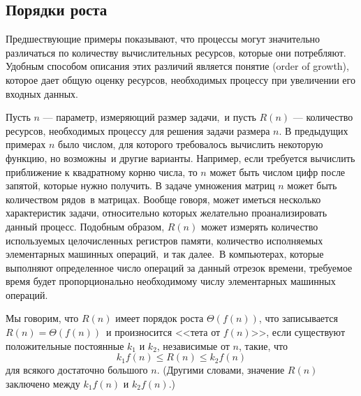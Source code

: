 \subsection{Порядки роста}
\label{ORDERS-OF-GROWTH}


Предшествующие примеры показывают, что процессы могут
значительно различаться по количеству вычислительных
ресурсов, которые они потребляют.  Удобным способом описания этих
различий является понятие
 (order of growth), которое дает общую оценку ресурсов, необходимых
процессу при увеличении его входных данных.

Пусть $n$ --- параметр, измеряющий размер
задачи,~и пусть $R(n)$ --- количество ресурсов, необходимых 
процессу для решения задачи размера $n$. В предыдущих
примерах $n$ было числом, для которого требовалось
вычислить некоторую функцию, но возможны~и другие варианты.
Например, если требуется вычислить приближение к
квадратному корню числа, то $n$ может быть числом цифр
после запятой, которые нужно получить. В задаче умножения матриц
$n$ может быть количеством рядов~в матрицах.  Вообще
говоря, может иметься несколько характеристик задачи, относительно
которых желательно проанализировать данный процесс.
Подобным образом, $R(n)$ может измерять количество
используемых целочисленных регистров памяти, количество исполняемых
элементарных машинных операций,~и так далее.~В компьютерах, которые
выполняют определенное число операций за данный отрезок времени,
требуемое время будет пропорционально необходимому числу элементарных
машинных операций.

Мы говорим, что $R(n)$ имеет порядок роста 
$\Theta(f(n))$, что записывается $R(n) =
\Theta(f(n))$~и произносится <<тета от $f(n)$>>, если 
существуют положительные постоянные $k_1$ и
$k_2$, независимые от $n$, такие, что
$$
k_1 f(n) \le R(n) \le k_2 f(n)
$$
для всякого достаточно большого $n$. (Другими словами,
значение $R(n)$ заключено между $k_1 f(n)$ и
$k_2 f(n)$.)

